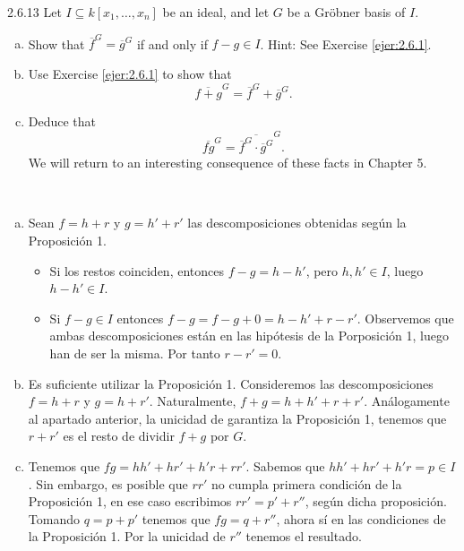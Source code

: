 \documentclass[twoside]{article}
\begin{document}
\begin{ejercicio}{2.6.13}
Let $I ⊆ k[x_1,\dots , x_n]$ be an ideal, and let $G$ be a Gröbner basis of $I$.
\begin{enumerate}[a.]
\item Show that $\overline{f}^G = \overline{g}^G$ if and only if $f − g ∈ I$. Hint: See Exercise \ref{ejer:2.6.1}.
\item Use Exercise \ref{ejer:2.6.1} to show that
$$\overline{f + g}^G = \overline{f}^G + \overline{g}^G.$$
\item Deduce that
$$\overline{fg}^G = \overline{\overline{f}^G \cdot  \overline{g}^G}^G
.$$
We will return to an interesting consequence of these facts in Chapter 5.
\end{enumerate}
\end{ejercicio}
\begin{solucion}\
\begin{enumerate}[a.]
\item Sean $f=h+r$ y $g=h'+r'$ las descomposiciones obtenidas según la Proposición 1. 
\begin{itemize}
\item Si los restos coinciden, entonces $f-g=h-h'$, pero $h,h'\in I$, luego $h-h'\in I$. 
\item Si $f-g\in I$ entonces $f-g=f-g+0 = h-h' + r-r'$. Observemos que ambas descomposiciones están en las hipótesis de la Porposición 1, luego han de ser la misma. Por tanto $r-r'=0$.
\end{itemize} 
\item Es suficiente utilizar la Proposición 1. Consideremos las descomposiciones $f=h+r$ y $g=h+r'$. Naturalmente, $f+g=h+h'+r+r'$. Análogamente al apartado anterior, la unicidad de garantiza la Proposición 1, tenemos que $r+r'$ es el resto de dividir $f+g$ por $G$.
\item Tenemos que $fg = hh'+hr'+h'r+rr'$. Sabemos que $hh'+hr'+h'r = p \in I$. Sin embargo, es posible que $rr'$ no cumpla primera condición de la Proposición 1, en ese caso escribimos $rr'=p'+r''$, según dicha proposición. Tomando $q=p+p'$ tenemos que $fg=q+r''$, ahora sí en las condiciones de la Proposición 1. Por la unicidad de $r''$ tenemos el resultado.
\end{enumerate}
\end{solucion}
\end{document}
